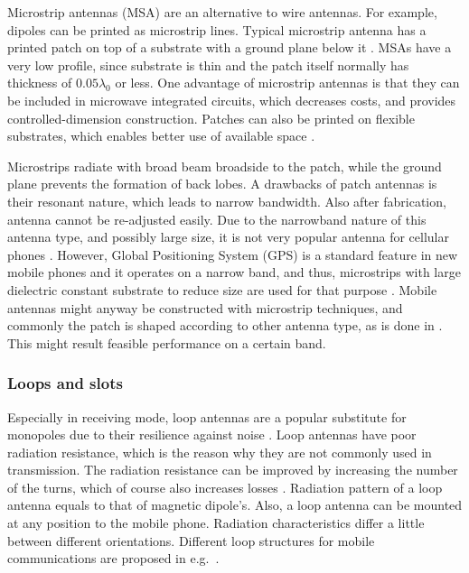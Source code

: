 Microstrip antennas (MSA) are an alternative to wire antennas. For example, dipoles can be printed as microstrip lines. Typical microstrip antenna has a printed patch on top of a substrate with a ground plane below it \cite{stutzman}. MSAs have a very low profile, since substrate is thin and the patch itself normally has thickness of $0.05\lambda_0$ or less. One advantage of microstrip antennas is that they can be included in microwave integrated circuits, which decreases costs, and provides controlled-dimension construction. Patches can also be printed on flexible substrates, which enables better use of available space \cite{stutzman}.

Microstrips radiate with broad beam broadside to the patch, while the ground plane prevents the formation of back lobes. A drawbacks of patch antennas is their resonant nature, which leads to narrow bandwidth. Also after fabrication, antenna cannot be re-adjusted easily. Due to the narrowband nature of this antenna type, and possibly large size, it is not very popular antenna for cellular phones \cite{stutzman}. However, Global Positioning System (GPS) is a standard feature in new mobile phones and it operates on a narrow band, and thus, microstrips with large dielectric constant substrate to reduce size are used for that purpose \cite{stutzman}. Mobile antennas might anyway be constructed with microstrip techniques, and commonly the patch is shaped according to other antenna type, as is done in \cite{microstrip_example1,microstrip_example2}. This might result feasible performance on a certain band.

\subsubsection{Loops and slots}
\label{sec:loop}
Especially in receiving mode, loop antennas are a popular substitute for monopoles due to their resilience against noise \cite{balanis}. Loop antennas have poor radiation resistance, which is the reason why they are not commonly used in transmission. The radiation resistance can be improved by increasing the number of the turns, which of course also increases losses \cite{stutzman}. Radiation pattern of a loop antenna equals to that of magnetic dipole's.  Also, a loop antenna can be mounted at any position to the mobile phone. Radiation characteristics differ a little between different orientations. Different loop structures for mobile communications are proposed in e.g.\ \cite{loop_example1,loop_example2,loop_example3}.

